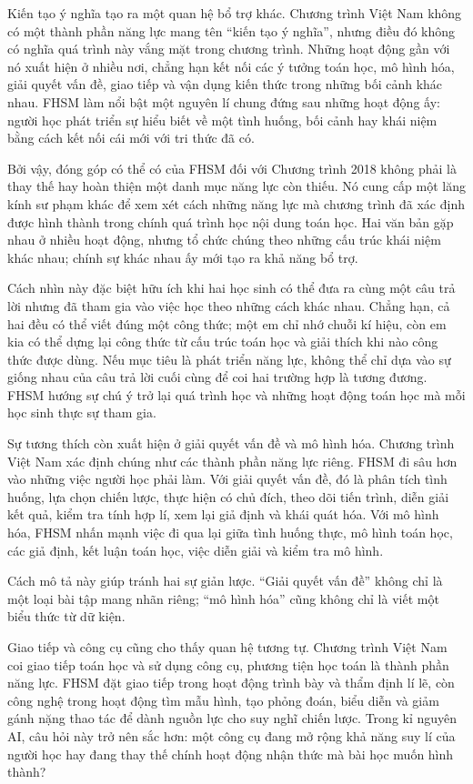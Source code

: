 Kiến tạo ý nghĩa tạo ra một quan hệ bổ trợ khác. Chương trình Việt Nam không có một thành phần năng lực mang tên “kiến tạo ý nghĩa”, nhưng điều đó không có nghĩa quá trình này vắng mặt trong chương trình. Những hoạt động gần với nó xuất hiện ở nhiều nơi, chẳng hạn kết nối các ý tưởng toán học, mô hình hóa, giải quyết vấn đề, giao tiếp và vận dụng kiến thức trong những bối cảnh khác nhau. FHSM làm nổi bật một nguyên lí chung đứng sau những hoạt động ấy: người học phát triển sự hiểu biết về một tình huống, bối cảnh hay khái niệm bằng cách kết nối cái mới với tri thức đã có.

Bởi vậy, đóng góp có thể có của FHSM đối với Chương trình 2018 không phải là thay thế hay hoàn thiện một danh mục năng lực còn thiếu. Nó cung cấp một lăng kính sư phạm khác để xem xét cách những năng lực mà chương trình đã xác định được hình thành trong chính quá trình học nội dung toán học. Hai văn bản gặp nhau ở nhiều hoạt động, nhưng tổ chức chúng theo những cấu trúc khái niệm khác nhau; chính sự khác nhau ấy mới tạo ra khả năng bổ trợ.

Cách nhìn này đặc biệt hữu ích khi hai học sinh có thể đưa ra cùng một câu trả lời nhưng đã tham gia vào việc học theo những cách khác nhau. Chẳng hạn, cả hai đều có thể viết đúng một công thức; một em chỉ nhớ chuỗi kí hiệu, còn em kia có thể dựng lại công thức từ cấu trúc toán học và giải thích khi nào công thức được dùng. Nếu mục tiêu là phát triển năng lực, không thể chỉ dựa vào sự giống nhau của câu trả lời cuối cùng để coi hai trường hợp là tương đương. FHSM hướng sự chú ý trở lại quá trình học và những hoạt động toán học mà mỗi học sinh thực sự tham gia.

Sự tương thích còn xuất hiện ở giải quyết vấn đề và mô hình hóa. Chương trình Việt Nam xác định chúng như các thành phần năng lực riêng. FHSM đi sâu hơn vào những việc người học phải làm. Với giải quyết vấn đề, đó là phân tích tình huống, lựa chọn chiến lược, thực hiện có chủ đích, theo dõi tiến trình, diễn giải kết quả, kiểm tra tính hợp lí, xem lại giả định và khái quát hóa. Với mô hình hóa, FHSM nhấn mạnh việc đi qua lại giữa tình huống thực, mô hình toán học, các giả định, kết luận toán học, việc diễn giải và kiểm tra mô hình.

Cách mô tả này giúp tránh hai sự giản lược. ``Giải quyết vấn đề'' không chỉ là một loại bài tập mang nhãn riêng; ``mô hình hóa'' cũng không chỉ là viết một biểu thức từ dữ kiện.

Giao tiếp và công cụ cũng cho thấy quan hệ tương tự. Chương trình Việt Nam coi giao tiếp toán học và sử dụng công cụ, phương tiện học toán là thành phần năng lực. FHSM đặt giao tiếp trong hoạt động trình bày và thẩm định lí lẽ, còn công nghệ trong hoạt động tìm mẫu hình, tạo phỏng đoán, biểu diễn và giảm gánh nặng thao tác để dành nguồn lực cho suy nghĩ chiến lược. Trong kỉ nguyên AI, câu hỏi này trở nên sắc hơn: một công cụ đang mở rộng khả năng suy lí của người học hay đang thay thế chính hoạt động nhận thức mà bài học muốn hình thành?

